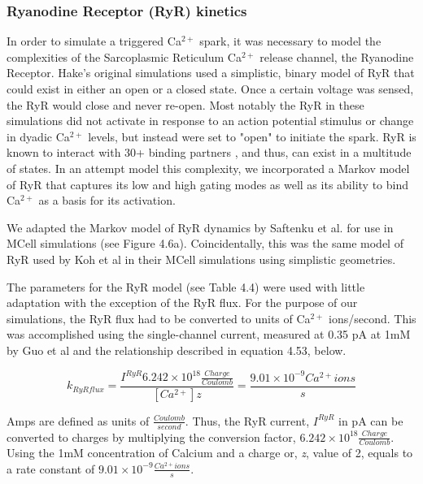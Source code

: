 \documentclass[12pt]{ucsddissertation}
\begin{document}
\subsubsection{Ryanodine Receptor (RyR) kinetics}

In order to simulate a triggered Ca$^{2+}$ spark, it was necessary to model the complexities of the Sarcoplasmic Reticulum Ca$^{2+}$ release channel, the Ryanodine Receptor. Hake's original simulations used a simplistic, binary model of RyR that could exist in either an open or a closed state. Once a certain voltage was sensed, the RyR would close and never re-open. Most notably the RyR in these simulations did not activate in response to an action potential stimulus or change in dyadic Ca$^{2+}$ levels, but instead were set to "open" to initiate the spark. RyR is known to interact with 30+ binding partners \cite{Song2011}, and thus, can exist in a multitude of states. In an attempt model this complexity, we incorporated a Markov model of RyR that captures its low and high gating modes as well as its ability to bind Ca$^{2+}$ as a basis for its activation.

We adapted the Markov model of RyR dynamics by Saftenku et al. \cite{Saftenku2001} for use in MCell simulations (see Figure 4.6a). Coincidentally, this was the same model of RyR used by Koh et al in their MCell simulations using simplistic geometries\cite{Koh2006}. 

The parameters for the RyR model (see Table 4.4) were used with little adaptation with the exception of the RyR flux. For the purpose of our simulations, the RyR flux had to be converted to units of Ca$^{2+}$ ions/second. This was accomplished using the single-channel current, measured at 0.35 pA at 1mM by Guo et al \cite{Guo2012} and the relationship described in equation 4.53, below.

\begin{equation}
k_{RyRflux} = \frac {I^{RyR}6.242\times 10^{18}\frac{Charge}{Coulomb}}{\left[ Ca^{2+}\right] z} = \frac{9.01\times10^{-9}  Ca^{2+}ions}{s}
\end{equation}

Amps are defined as units of $\frac{Coulomb}{second}$. Thus, the RyR current, $I^{RyR}$ in pA can be converted to charges by multiplying the conversion factor, $6.242\times 10^{18}\frac{Charge}{Coulomb}$. Using the 1mM concentration of Calcium and a charge or, \textit{z}, value of 2, equals to a rate constant of $ 9.01\times10^{-9}\frac{ Ca^{2+}ions}{s}$.
\end{document}
